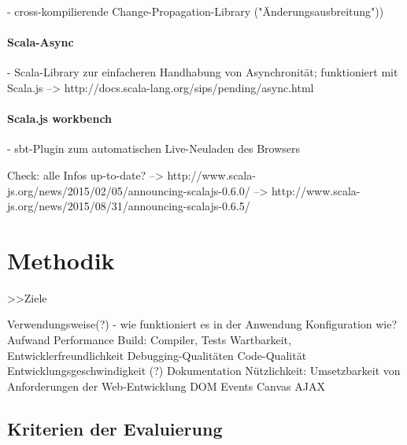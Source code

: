 \documentclass[a4paper, 12pt, hidelinks, listof=totoc, listoftables=totoc, bibliography=totoc]{scrreprt}
\begin{document}
- cross-kompilierende Change-Propagation-Library ("Änderungsausbreitung"))

\subsubsection{Scala-Async}

- Scala-Library zur einfacheren Handhabung von Asynchronität; funktioniert mit Scala.js -->  http://docs.scala-lang.org/sips/pending/async.html

\subsubsection{Scala.js workbench}

- sbt-Plugin zum automatischen Live-Neuladen des Browsers


Check: alle Infos up-to-date?
-->  http://www.scala-js.org/news/2015/02/05/announcing-scalajs-0.6.0/
-->  http://www.scala-js.org/news/2015/08/31/announcing-scalajs-0.6.5/





\chapter{Methodik}

>>Ziele

Verwendungsweise(?) - wie funktioniert es in der Anwendung
Konfiguration
	wie?
	Aufwand
Performance
	Build: Compiler, Tests
Wartbarkeit, Entwicklerfreundlichkeit
	Debugging-Qualitäten
	Code-Qualität
	Entwicklungsgeschwindigkeit (?)
	Dokumentation
Nützlichkeit: Umsetzbarkeit von Anforderungen der Web-Entwicklung
	DOM
	Events
	Canvas
	AJAX

\section{Kriterien der Evaluierung}
\end{document}
